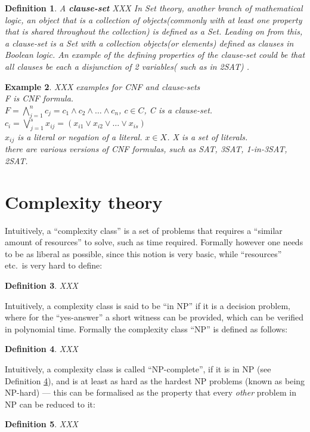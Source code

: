 \documentclass[a4paper]{report}
\newtheorem{defi}{Definition}[section]
\newtheorem{examp}[defi]{Example}
\begin{document}
\begin{defi}\label{def:CLS}
  A \textbf{clause-set}  XXX In Set theory, another branch of mathematical logic, an object that is a collection of  objects(commonly with at least one property that is shared throughout the collection) is defined as a Set. Leading on from this, a clause-set is a Set with a collection objects(or elements) defined as clauses in Boolean logic. An example of the defining properties of the clause-set could be that all clauses be each a disjunction of 2 variables( such as in 2SAT) .
\end{defi}

\begin{examp}\label{exp:CLS}
  XXX examples for CNF and clause-sets\\
F is CNF formula.\\ 
$F = \bigwedge_{j=1}^{n} c_j = c_1 \wedge c_2 \wedge \dots \wedge c_n$,
$c \in C$,  C is a clause-set.\\
$c_i = \bigvee_{j=1}^{s} x_{ij} =  (x_{i1} \vee x_{i2} \vee \dots \vee x_{is})$\\
$x_{ij}$ is a literal or negation of a literal.
$x \in X$. X is a set of literals.\\

there are various versions of CNF formulas, such as SAT, 3SAT, 1-in-3SAT, 2SAT.
\end{examp}


\section{Complexity theory}
\label{sec:basicscomplexitytheory}

Intuitively, a ``complexity class'' is a set of problems that requires a ``similar amount of resources'' to solve, such as time required. Formally however one needs to be as liberal as possible, since this notion is very basic, while ``resources'' etc.\ is very hard to define:
\begin{defi}\label{def:complexityclass}
  XXX
\end{defi}

Intuitively, a complexity class is said to be ``in NP'' if it is a decision problem, where for the ``yes-answer'' a short witness can be provided, which can be verified in polynomial time. Formally the complexity class ``NP'' is defined as follows:
\begin{defi}\label{def:inNP}
  XXX
\end{defi}

Intuitively, a complexity class is called ``NP-complete'', if it is in NP (see Definition \ref{def:inNP}), and is at least as hard as the hardest NP problems (known as being NP-hard) --- this can be formalised as the property that every \emph{other} problem in NP can be reduced to it:
\begin{defi}\label{def:NPcomplete}
  XXX
\end{defi}
\end{document}
